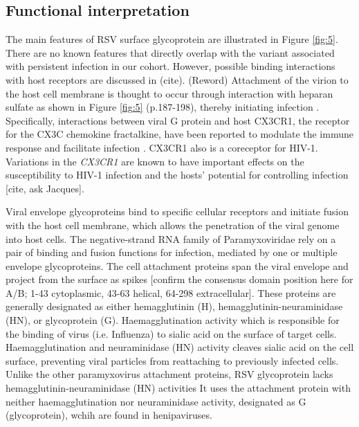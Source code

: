 \documentclass{article}
\begin{document}

\subsection{Functional interpretation}
The main features of RSV surface glycoprotein are illustrated in Figure \ref{fig:5}.
There are no known features that directly overlap with the variant associated with persistent infection in our cohort. 
However, possible binding interactions with host receptors are discussed in (cite).
(Reword) Attachment of the virion to the host cell membrane is thought to occur through interaction with heparan sulfate as shown in Figure \ref{fig:5}
(p.187-198), thereby initiating infection 
\cite{levine1987demonstration, feldman1999identification, feldman2000fusion}.
Specifically, interactions between viral G protein and host CX3CR1, the receptor for the CX3C chemokine fractalkine, have been reported to modulate the immune response and facilitate infection 
\cite{johnson2015respiratory, tripp2001cx3c, jeong2015cx3cr1}.
CX3CR1 also is a coreceptor for HIV-1. 
Variations in the \textit{CX3CR1} are known to have important effects on the susceptibility to HIV-1 infection and the hosts' potential for controlling infection [cite, ask Jacques].

Viral envelope glycoproteins bind to specific cellular receptors and initiate fusion with the host cell membrane, 
which allows the penetration of the viral genome into host cells. 
The negative-strand RNA family of Paramyxoviridae rely on a pair of binding and fusion functions for infection, mediated by one or multiple envelope glycoproteins.
The cell attachment proteins span the viral envelope and project from the surface as spikes 
[confirm the consensus domain position here for A/B; 1-43 cytoplasmic, 43-63 helical, 64-298 extracellular].
These proteins are generally designated as either hemagglutinin (H), hemagglutinin-neuraminidase (HN), or glycoprotein (G). 
Haemagglutination activity which is responsible for the binding of virus (i.e. Influenza) to sialic acid on the surface of target cells.
Haemagglutination and neuraminidase (HN) activity cleaves sialic acid on the cell surface, preventing viral particles from reattaching to previously infected cells. 
Unlike the other paramyxovirus attachment proteins, 
RSV glycoprotein lacks hemagglutinin-neuraminidase (HN) activities
It uses the attachment protein with neither haemagglutination nor neuraminidase activity, designated as G (glycoprotein), wchih are found in henipaviruses.
\cite{takimoto2002role, malvoisin1993measles, hu1992functional, horvath1992biological, bousse1994regions}
\end{document}
